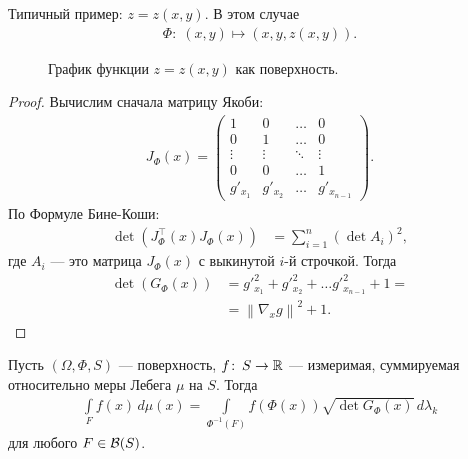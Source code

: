Типичный пример: $z = z(x, y)$. В этом случае \begin{align*}
 \Phi \colon\; (x, y) \mapsto (x, y, z(x, y))
.\end{align*}

\begin{figure}[ht]
    \centering
    \caption{График функции $z = z(x,y)$ как поверхность.}
    \label{fig:plot_z_x_y}
\end{figure}

\begin{proof}
 Вычислим сначала матрицу Якоби:
 \begin{align*}
  J_{\Phi}(x) = \begin{pmatrix}
   1 & 0 & \ldots & 0 \\
   0 & 1 & \ldots & 0 \\
   \vdots & \vdots & \ddots & \vdots \\
   0 & 0 & \ldots & 1 \\
   g'_{x_1} & g'_{x_2} & \ldots & g'_{x_{n-1}}
  \end{pmatrix}
 .\end{align*} По Формуле Бине-Коши:
 \begin{align*}
  \det(J^{\top}_{\Phi}(x) J_{\Phi}(x)) &= \sum_{i = 1}^{n} \left( \det A_i \right)^{2}
 ,\end{align*} где $A_i$ --- это матрица $J_{\Phi}(x)$ с выкинутой $i$-й строчкой. Тогда
 \begin{align*}
  \det (G_{\Phi}(x)) &= g'^{2}_{x_1} + g'^{2}_{x_2} + \ldots g'^{2}_{x_{n-1}} + 1 = \\ 
  &= \left\| \nabla_x g \right\|^{2} + 1
 .\end{align*} 
\end{proof}
\begin{thm}
 Пусть $(\Omega, \Phi, S)$ --- поверхность, $f \colon\, S \to \mathbb{R} $  --- измеримая, суммируемая относительно меры Лебега $\mu$  на $S$. Тогда
 \begin{align}
  \label{equation:formula_integral_on_surface}
  \int\limits_{F} f(x) \, d\mu(x)  = \int\limits_{\Phi^{-1}(F)} f(\Phi(x)) \sqrt{\det G_{\Phi}(x)} \, d\lambda_k
 \end{align} для любого $F \in \mathcal{B}(S)$.
\end{thm}
